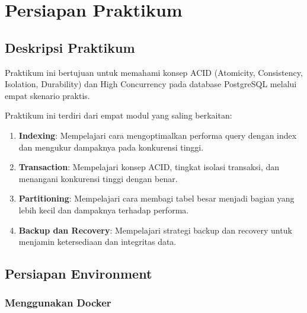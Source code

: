 
\chapter*{Persiapan Praktikum}

\renewcommand{\thesection}{\arabic{section}}

\section{Deskripsi Praktikum}

Praktikum ini bertujuan untuk memahami konsep ACID (Atomicity, Consistency, Isolation, Durability) dan High Concurrency pada database PostgreSQL melalui empat skenario praktis.

Praktikum ini terdiri dari empat modul yang saling berkaitan:

\begin{enumerate}
    \item \textbf{Indexing}: Mempelajari cara mengoptimalkan performa query dengan index dan mengukur dampaknya pada konkurensi tinggi.

    \item \textbf{Transaction}: Mempelajari konsep ACID, tingkat isolasi transaksi, dan menangani konkurensi tinggi dengan benar.

    \item \textbf{Partitioning}: Mempelajari cara membagi tabel besar menjadi bagian yang lebih kecil dan dampaknya terhadap performa.

    \item \textbf{Backup dan Recovery}: Mempelajari strategi backup dan recovery untuk menjamin ketersediaan dan integritas data.
\end{enumerate}


\section{Persiapan Environment}

\subsection{Menggunakan Docker}

